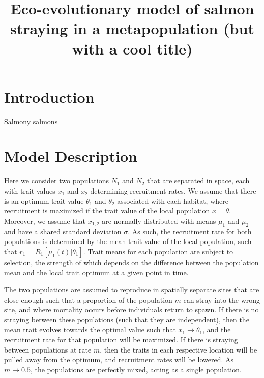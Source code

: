 \documentclass[twocolumn,preprintnumbers,amsmath,amssymb,superscriptaddress]{revtex4}
\begin{document}
\title{Eco-evolutionary model of salmon straying in a metapopulation (but with a cool title)}



\maketitle



\section*{Introduction}

Salmony salmons

\section*{Model Description}

Here we consider two populations $N_1$ and $N_2$ that are separated in space, each with trait values $x_1$ and $x_2$ determining recruitment rates.
We assume that there is an optimum trait value $\theta_1$ and $\theta_2$ associated with each habitat, where recruitment is maximized if the trait value of the local population $x = \theta$.
Moreover, we assume that $x_{1,2}$ are normally distributed with means $\mu_1$ and $\mu_2$ and have a shared standard deviation $\sigma$.
As such, the recruitment rate for both populations is determined by the mean trait value of the local population, such that $r_1 = R_1[\mu_1(t)|\theta_1]$.
Trait means for each population are subject to selection, the strength of which depends on the difference between the population mean and the local trait optimum at a given point in time.

The two populations are assumed to reproduce in spatially separate sites that are close enough such that a proportion of the population $m$ can stray into the wrong site, and where mortality occurs before individuals return to spawn.
If there is no straying between these populations (such that they are independent), then the mean trait evolves towards the optimal value such that $x_1 \rightarrow \theta_1$, and the recruitment rate for that population will be maximized.
If there is straying between populations at rate $m$, then the traits in each respective location will be pulled away from the optimum, and recruitment rates will be lowered.
As $m \rightarrow 0.5$, the populations are perfectly mixed, acting as a single population.
\end{document}
